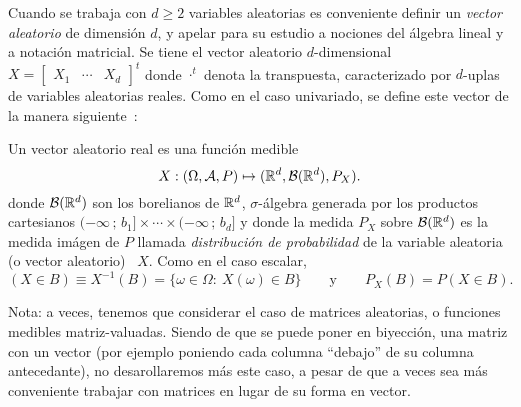 Cuando se trabaja  con $d\geq 2$ variables aleatorias  es conveniente definir un
{\it vector aleatorio}  de dimensi\'on $d$, y apelar para  su estudio a nociones
del \'algebra  lineal y  a notaci\'on matricial.   Se tiene el  vector aleatorio
$d$-dimensional \ $X = \begin{bmatrix} X_1 & \cdots & X_d \end{bmatrix}^t$ donde
$\cdot^t$  denota  la  transpuesta,  caracterizado por  $d$-uplas  de  variables
aleatorias reales.   Como en  el caso  univariado, se define  este vector  de la
manera siguiente~\cite{AthLah06, Coh13, Bre88}:
%
\begin{definicion}
\label{Def:MP:VectorAleatorioReal}
%
  Un vector aleatorio real es una funci\'on medible
  \[
  X: (\Omega,\mathcal{A},P) \mapsto (\mathbb{R}^d,\mathcal{B}(\mathbb{R}^d),P_X).
  \]
  donde  $\mathcal{B}(\mathbb{R}^d)$  son  los  borelianos  de  $\mathbb{R}^d$,  $\sigma$-\'algebra
  generada por  los productos cartesianos $(-\infty  \, ; \,  b_1] \times \cdots
  \times (-\infty \,  ; \, b_d]$ y donde la medida  $P_X$ sobre $\mathcal{B}(\mathbb{R}^d)$ es
  la medida  im\'agen de  $P$ llamada {\it  distribuci\'on de probabilidad}  de la
  variable aleatoria (o vector aleatorio) \ $X$. Como en el caso escalar,
 \[
 (X \in B) \equiv X^{-1}(B) = \{ \omega \in \Omega: \: X(\omega) \in B \} \qquad
 \mbox{y} \qquad P_X(B) = P(X \in B).
 \]
\end{definicion}
%
\noindent Nota: a veces, tenemos  que considerar el caso de matrices aleatorias,
o  funciones  medibles  matriz-valuadas.  Siendo   de  que  se  puede  poner  en
biyecci\'on,  una  matriz con  un  vector  (por  ejemplo poniendo  cada  columna
``debajo''  de su  columna antecedante),  no desarollaremos  m\'as este  caso, a
pesar de que a veces sea m\'as  conveniente trabajar con matrices en lugar de su
forma en vector.

\

